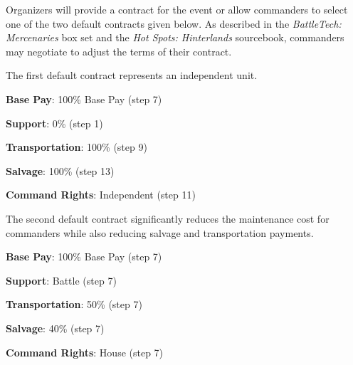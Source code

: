 Organizers will provide a contract for the event or allow commanders to select one of the two default contracts given below.
As described in the \emph{BattleTech: Mercenaries} box set and the \emph{Hot Spots: Hinterlands} sourcebook, commanders may negotiate to adjust the terms of their contract.

The first default contract represents an independent unit.

\begin{description}

  \item {\bfseries Base Pay}: 100\% Base Pay (step 7)

  \item {\bfseries Support}: 0\% (step 1)

  \item {\bfseries Transportation}: 100\% (step 9)

  \item {\bfseries Salvage}: 100\% (step 13)

  \item {\bfseries Command Rights}: Independent (step 11)

\end{description}

The second default contract significantly reduces the maintenance cost for commanders while also reducing salvage and transportation payments.

\begin{description}

  \item {\bfseries Base Pay}: 100\% Base Pay (step 7)

  \item {\bfseries Support}: Battle (step 7)

  \item {\bfseries Transportation}: 50\% (step 7)

  \item {\bfseries Salvage}: 40\% (step 7)

  \item {\bfseries Command Rights}: House (step 7)

\end{description}
